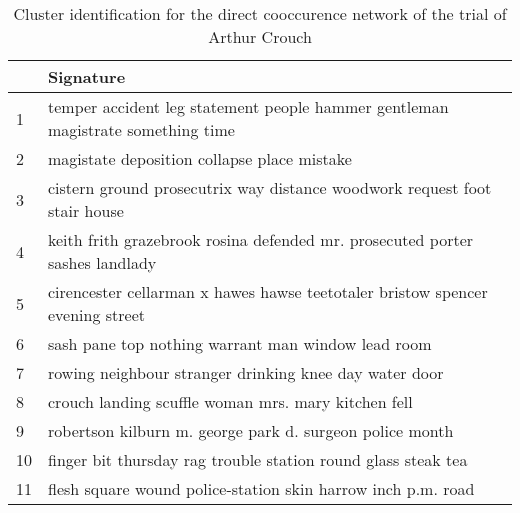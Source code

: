 \begin{table}[ht]
\centering
\begin{tabular}{p{1cm}p{5cm}}
  \hline
 & Signature \\ 
  \hline
1 & temper accident leg statement people hammer gentleman magistrate something time \\ 
  2 & magistate deposition collapse place mistake \\ 
  3 & cistern ground prosecutrix way distance woodwork request foot stair house \\ 
  4 & keith frith grazebrook rosina defended mr. prosecuted porter sashes landlady \\ 
  5 & cirencester cellarman x hawes hawse teetotaler bristow spencer evening street \\ 
  6 & sash pane top nothing warrant man window lead room \\ 
  7 & rowing neighbour stranger drinking knee day water door \\ 
  8 & crouch landing scuffle woman mrs. mary kitchen fell \\ 
  9 & robertson kilburn m. george park d. surgeon police month \\ 
  10 & finger bit thursday rag trouble station round glass steak tea \\ 
  11 & flesh square wound police-station skin harrow inch p.m. road \\ 
   \hline
\end{tabular}
\caption{Cluster identification for the direct cooccurence network of the trial of Arthur Crouch} 
\label{c3_crouch_ppmi_sig}
\end{table}
